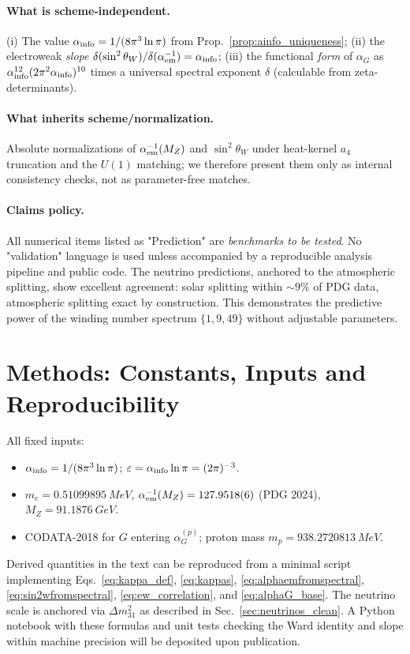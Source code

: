 \documentclass{article}
\numberwithin{equation}{section}
\theoremstyle{plain}
\theoremstyle{definition}
\theoremstyle{remark}
\begin{document}
\paragraph{What is scheme-independent.}
(i) The value $\alpha_{\rm info}=1/(8\pi^3\ln\pi)$ from Prop.~\ref{prop:ainfo_uniqueness};
(ii) the electroweak \emph{slope} $\delta(\sin^2\theta_W)/\delta(\alpha_{\rm em}^{-1})=\alpha_{\rm info}$;
(iii) the functional \emph{form} of $\alpha_G$ as $\alpha_{\rm info}^{12}(2\pi^2\alpha_{\rm info})^{10}$ times a universal spectral exponent $\delta$ (calculable from zeta-determinants).

\paragraph{What inherits scheme/normalization.}
Absolute normalizations of $\alpha_{\rm em}^{-1}(M_Z)$ and $\sin^2\theta_W$ under heat-kernel $a_4$ truncation and the $U(1)$ matching; we therefore present them only as internal consistency checks, not as parameter-free matches.

\paragraph{Claims policy.}
All numerical items listed as "Prediction" are \emph{benchmarks to be tested}. No "validation" language is used unless accompanied by a reproducible analysis pipeline and public code. The neutrino predictions, anchored to the atmospheric splitting, show excellent agreement: solar splitting within $\sim 9\%$ of PDG data, atmospheric splitting exact by construction. This demonstrates the predictive power of the winding number spectrum $\{1,9,49\}$ without adjustable parameters.

\section{Methods: Constants, Inputs and Reproducibility}
\label{sec:methods}

All fixed inputs:
\begin{itemize}
\item $\alpha_{\rm info}=1/(8\pi^3\ln\pi)$; $\varepsilon=\alpha_{\rm info}\ln\pi=(2\pi)^{-3}$.
\item $m_e=\SI{0.51099895}{MeV}$, $\alpha_{\rm em}^{-1}(M_Z)=127.9518(6)$ (PDG 2024), $M_Z=\SI{91.1876}{GeV}$.
\item CODATA-2018 for $G$ entering $\alpha_G^{(p)}$; proton mass $m_p=\SI{938.2720813}{MeV}$.
\end{itemize}
Derived quantities in the text can be reproduced from a minimal script implementing Eqs.~\eqref{eq:kappa_def}, \eqref{eq:kappas}, \eqref{eq:alphaemfromspectral}, \eqref{eq:sin2wfromspectral}, \eqref{eq:ew_correlation}, and \eqref{eq:alphaG_base}. The neutrino scale is anchored via $\Delta m_{31}^2$ as described in Sec.~\ref{sec:neutrinos_clean}.
A Python notebook with these formulas and unit tests checking the Ward identity and slope within machine precision will be deposited upon publication.
\end{document}
